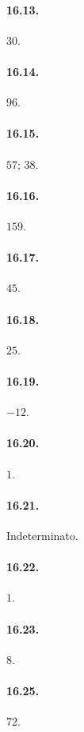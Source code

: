 \begin{multicols}{2}
\paragraph{16.13.}
$30$.

\paragraph{16.14.}
$96$.

\paragraph{16.15.}
$57$; $38$.

\paragraph{16.16.}
$159$.

\paragraph{16.17.}
$45$.

\paragraph{16.18.}
$25$.

\paragraph{16.19.}
$-12$.

\paragraph{16.20.}
$1$.

\paragraph{16.21.}
Indeterminato.

\paragraph{16.22.}
$1$.

\paragraph{16.23.}
$8$.

\paragraph{16.25.}
$72$.


\end{multicols}

